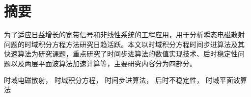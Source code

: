 \chapter*{摘\enspace{}要}

为了适应日益增长的宽带信号和非线性系统的工程应用，用于分析瞬态电磁散射
问题的时域积分方程方法研究日趋活跃。本文以时域积分方程时间步进算法及其
快速算法为研究课题，重点研究了时间步进算法的数值实现技术、后时稳定性问
题以及两层平面波算法加速计算等，主要研究内容分为四部分。

\bigskip

%
%
时域电磁散射，
时域积分方程，
时间步进算法，
后时不稳定性，
时域平面波算法
